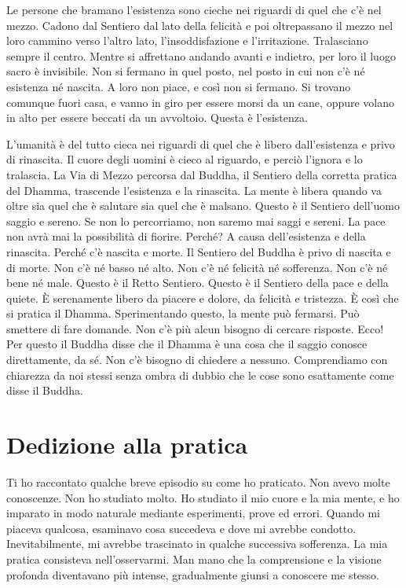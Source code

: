 Le persone che bramano l'esistenza sono cieche nei riguardi di quel che
c'è nel mezzo. Cadono dal Sentiero dal lato della felicità e poi
oltrepassano il mezzo nel loro cammino verso l'altro lato,
l'insoddisfazione e l'irritazione. Tralasciano sempre il centro. Mentre
si affrettano andando avanti e indietro, per loro il luogo sacro è
invisibile. Non si fermano in quel posto, nel posto in cui non c'è né
esistenza né nascita. A loro non piace, e così non si fermano. Si
trovano comunque fuori casa, e vanno in giro per essere morsi da un
cane, oppure volano in alto per essere beccati da un avvoltoio. Questa è
l'esistenza.

L'umanità è del tutto cieca nei riguardi di quel che è libero
dall'esistenza e privo di rinascita. Il cuore degli uomini è cieco al
riguardo, e perciò l'ignora e lo tralascia. La Via di Mezzo percorsa dal
Buddha, il Sentiero della corretta pratica del Dhamma, trascende
l'esistenza e la rinascita. La mente è libera quando va oltre sia quel
che è salutare sia quel che è malsano. Questo è il Sentiero dell'uomo
saggio e sereno. Se non lo percorriamo, non saremo mai saggi e sereni.
La pace non avrà mai la possibilità di fiorire. Perché? A causa
dell'esistenza e della rinascita. Perché c'è nascita e morte. Il
Sentiero del Buddha è privo di nascita e di morte. Non c'è né basso né
alto. Non c'è né felicità né sofferenza. Non c'è né bene né male. Questo
è il Retto Sentiero. Questo è il Sentiero della pace e della quiete. È
serenamente libero da piacere e dolore, da felicità e tristezza. È così
che si pratica il Dhamma. Sperimentando questo, la mente può fermarsi.
Può smettere di fare domande. Non c'è più alcun bisogno di cercare
risposte. Ecco! Per questo il Buddha disse che il Dhamma è una cosa che
il saggio conosce direttamente, da sé. Non c'è bisogno di chiedere a
nessuno. Comprendiamo con chiarezza da noi stessi senza ombra di dubbio
che le cose sono esattamente come disse il Buddha.

\section{Dedizione alla pratica}

Ti ho raccontato qualche breve episodio su come ho praticato. Non avevo
molte conoscenze. Non ho studiato molto. Ho studiato il mio cuore e la
mia mente, e ho imparato in modo naturale mediante esperimenti, prove ed
errori. Quando mi piaceva qualcosa, esaminavo cosa succedeva e dove mi
avrebbe condotto. Inevitabilmente, mi avrebbe trascinato in qualche
successiva sofferenza. La mia pratica consisteva nell'osservarmi. Man
mano che la comprensione e la visione profonda diventavano più intense,
gradualmente giunsi a conoscere me stesso.

